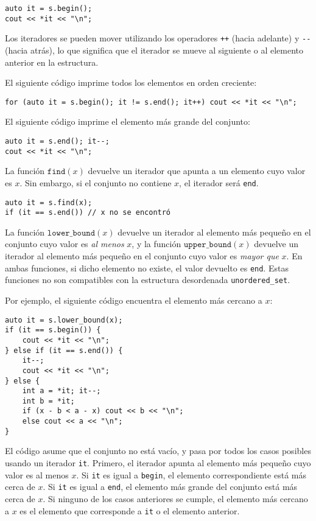 \begin{lstlisting}
auto it = s.begin();
cout << *it << "\n";
\end{lstlisting}

Los iteradores se pueden mover utilizando los operadores
\texttt{++} (hacia adelante) y \texttt{-{}-} (hacia atrás),
lo que significa que el iterador se mueve al siguiente
o al elemento anterior en la estructura.

El siguiente código imprime todos los elementos
en orden creciente:
\begin{lstlisting}
for (auto it = s.begin(); it != s.end(); it++) cout << *it << "\n";
\end{lstlisting}
El siguiente código imprime el elemento más grande del conjunto:
\begin{lstlisting}
auto it = s.end(); it--;
cout << *it << "\n";
\end{lstlisting}

La función $\texttt{find}(x)$ devuelve un iterador
que apunta a un elemento cuyo valor es $x$.
Sin embargo, si el conjunto no contiene $x$,
el iterador será \texttt{end}.

\begin{lstlisting}
auto it = s.find(x);
if (it == s.end()) // x no se encontró
\end{lstlisting}

La función $\texttt{lower\_bound}(x)$ devuelve
un iterador al elemento más pequeño en el conjunto
cuyo valor es \emph{al menos} $x$, y
la función $\texttt{upper\_bound}(x)$
devuelve un iterador al elemento más pequeño en el conjunto
cuyo valor es \emph{mayor que} $x$.
En ambas funciones, si dicho elemento no existe,
el valor devuelto es \texttt{end}.
Estas funciones no son compatibles con la
estructura desordenada \texttt{unordered\_set}.

\begin{samepage}
    Por ejemplo, el siguiente código encuentra el elemento
    más cercano a $x$:

    \begin{lstlisting}
auto it = s.lower_bound(x);
if (it == s.begin()) {
    cout << *it << "\n";
} else if (it == s.end()) {
    it--;
    cout << *it << "\n";
} else {
    int a = *it; it--;
    int b = *it;
    if (x - b < a - x) cout << b << "\n";
    else cout << a << "\n";
}
\end{lstlisting}

    El código asume que el conjunto no está vacío,
    y pasa por todos los casos posibles
    usando un iterador \texttt{it}.
    Primero, el iterador apunta al elemento más pequeño
    cuyo valor es al menos $x$.
    Si \texttt{it} es igual a \texttt{begin},
    el elemento correspondiente está más cerca de $x$.
    Si \texttt{it} es igual a \texttt{end},
    el elemento más grande del conjunto está más cerca de $x$.
    Si ninguno de los casos anteriores se cumple,
    el elemento más cercano a $x$ es el
    elemento que corresponde a \texttt{it} o el elemento anterior.
\end{samepage}


